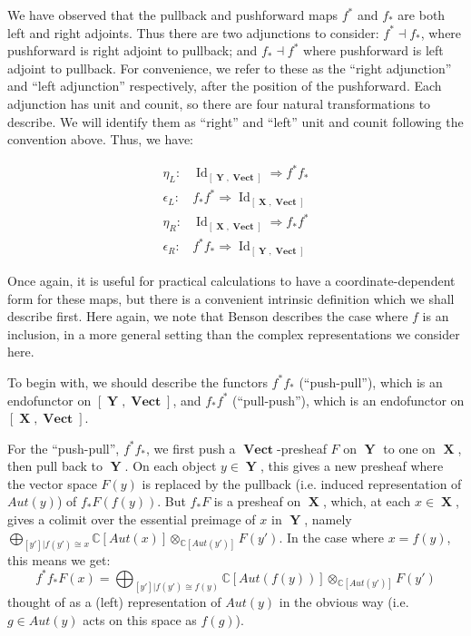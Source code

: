 \documentclass[10pt]{amsart}
\numberwithin{theorem}{subsection}
\newcommand{\opname}[1]{\operatorname{#1}}
\newcommand{\catname}[1]{\boldsymbol{\opname{{#1}}}}
\newcommand{\Id}{\opname{Id}}
\newcommand{\X}{\catname{X}}
\newcommand{\Y}{\catname{Y}}
\newcommand{\V}{\catname{Vect}}
\begin{document}
We have observed that the pullback and pushforward maps $f^{\ast}$ and
$f_{\ast}$ are both left and right adjoints.  Thus there are two
adjunctions to consider: $f^{\ast} \dashv f_{\ast}$, where pushforward
is right adjoint to pullback; and $f_{\ast} \dashv f^{\ast}$ where
pushforward is left adjoint to pullback.  For convenience, we refer to
these as the ``right adjunction'' and ``left adjunction''
respectively, after the position of the pushforward.  Each adjunction
has unit and counit, so there are four natural transformations to
describe.  We will identify them as ``right'' and ``left'' unit and
counit following the convention above.  Thus, we have:

\begin{align}
\eta_L : & \Id_{[\Y,\V]} \Longrightarrow f^{\ast} f_{\ast} \\
\epsilon_L : & f_{\ast} f^{\ast} \Longrightarrow \Id_{[\X,\V]} \\
\eta_R : & \Id_{[\X,\V]} \Longrightarrow f_{\ast} f^{\ast} \\
\epsilon_R : & f^{\ast} f_{\ast} \Longrightarrow \Id_{[\Y,\V]}
\end{align}

Once again, it is useful for practical calculations to have a
coordinate-dependent form for these maps, but there is a convenient
intrinsic definition which we shall describe first.  Here again, we
note that Benson \cite{benson} describes the case where $f$ is an
inclusion, in a more general setting than the complex representations
we consider here.

To begin with, we should describe the functors $f^{\ast} f_{\ast}$
(``push-pull''), which is an endofunctor on $[\Y,\V]$, and $f_{\ast}
f^{\ast}$ (``pull-push''), which is an endofunctor on $[\X,\V]$.

For the ``push-pull'', $f^{\ast} f_{\ast}$, we first push a
$\V$-presheaf $F$ on $\Y$ to one on $\X$, then pull back to $\Y$.  On
each object $y \in \Y$, this gives a new presheaf where the vector
space $F(y)$ is replaced by the pullback (i.e. induced representation
of $Aut(y)$) of $f_{\ast}F (f(y))$.  But $f_{\ast}F$ is a presheaf on
$\X$, which, at each $x \in \X$, gives a colimit over the essential
preimage of $x$ in $\Y$, namely $\bigoplus_{[y'] | f(y') \cong x}
\mathbb{C}[Aut(x)] \otimes_{\mathbb{C}[Aut(y')]} F(y')$.  In the case
where $x = f(y)$, this means we get:
\begin{equation}
f^{\ast} f_{\ast} F (x) = \bigoplus_{[y'] | f(y') \cong f(y)} \mathbb{C}[Aut(f(y))] \otimes_{\mathbb{C}[Aut(y')]} F(y')
\end{equation}
thought of as a (left) representation of $Aut(y)$ in the obvious way
(i.e. $g \in Aut(y)$ acts on this space as $f(g)$).
\end{document}
